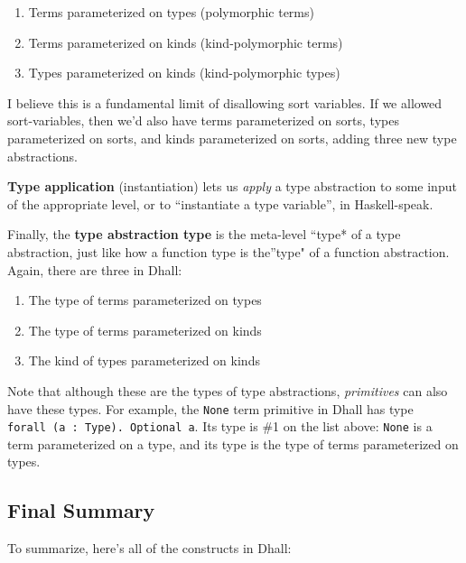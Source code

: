 \documentclass[]{article}
\begin{document}
\begin{enumerate}
\def\labelenumi{\arabic{enumi}.}
\tightlist
\item
  Terms parameterized on types (polymorphic terms)
\item
  Terms parameterized on kinds (kind-polymorphic terms)
\item
  Types parameterized on kinds (kind-polymorphic types)
\end{enumerate}

I believe this is a fundamental limit of disallowing sort variables. If we
allowed sort-variables, then we'd also have terms parameterized on sorts, types
parameterized on sorts, and kinds parameterized on sorts, adding three new type
abstractions.

\textbf{Type application} (instantiation) lets us \emph{apply} a type
abstraction to some input of the appropriate level, or to ``instantiate a type
variable'', in Haskell-speak.

Finally, the \textbf{type abstraction type} is the meta-level ``type* of a type
abstraction, just like how a function type is the''type" of a function
abstraction. Again, there are three in Dhall:

\begin{enumerate}
\def\labelenumi{\arabic{enumi}.}
\tightlist
\item
  The type of terms parameterized on types
\item
  The type of terms parameterized on kinds
\item
  The kind of types parameterized on kinds
\end{enumerate}

Note that although these are the types of type abstractions, \emph{primitives}
can also have these types. For example, the \texttt{None} term primitive in
Dhall has type \texttt{forall\ (a\ :\ Type).\ Optional\ a}. Its type is \#1 on
the list above: \texttt{None} is a term parameterized on a type, and its type is
the type of terms parameterized on types.

\hypertarget{final-summary}{%
\subsection{Final Summary}\label{final-summary}}

To summarize, here's all of the constructs in Dhall:
\end{document}
